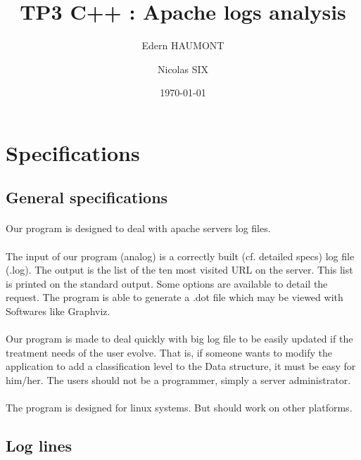 \documentclass[a4paper, 12pts]{article}
\title{TP3 C++ : Apache logs analysis}
\author{Edern HAUMONT}
\author{Nicolas SIX}
\affil{B3111}
\date{\today}
\begin{document}

\maketitle



\section{Specifications}
\subsection{General specifications}
\paragraph{}
Our program is designed to deal with apache servers log files.
\paragraph{}
The input of our program (analog) is a correctly built (cf. detailed specs) log file (.log). The output is the list of the ten most visited URL on the server. This list is printed on the standard output. Some options are available to detail the request. The program is able to generate a .dot file which may be viewed with Softwares like Graphviz.
\paragraph{}
 Our program is made to deal quickly with big log file to be easily updated if the treatment needs of the user evolve. That is, if someone wants to modify the application to add a classification level to the Data structure, it must be easy for him/her. The users should not be a programmer, simply a server administrator.
\paragraph{}
 The program is designed for linux systems. But should work on other platforms.

\subsection{Log lines}
\end{document}
